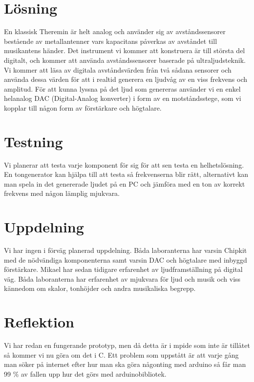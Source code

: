 \documentclass[a4paper,11pt]{article}
\begin{document}
\section*{Lösning}
En klassisk Theremin är helt analog och använder sig av avståndssensorer bestående av metallantenner vars kapacitans påverkas av avståndet till musikantens händer. Det instrument vi kommer att konstruera är till största del digitalt, och kommer att använda
avståndssensorer baserade på ultraljudsteknik. Vi kommer att läsa av digitala avståndsvärden från två sådana sensorer och använda dessa värden för att i realtid generera en ljudvåg av en viss frekvens och amplitud. För att kunna lyssna på det ljud som genereras använder vi en enkel helanalog DAC (Digital-Analog konverter) i form av en motståndsstege, som vi kopplar till någon form av förstärkare och högtalare.

\section*{Testning}
Vi planerar att testa varje komponent för sig för att sen testa en helhetslösning. En tongenerator kan hjälpa till att testa så frekvenserna blir rätt, alternativt kan man spela in det genererade ljudet på en PC och jämföra med en ton av korrekt frekvens med någon lämplig mjukvara.

\section*{Uppdelning}
Vi har ingen i förväg planerad uppdelning. Båda laboranterna har varsin Chipkit med de nödvändiga komponenterna samt varsin DAC och högtalare med inbyggd förstärkare. Mikael
har sedan tidigare erfarenhet av ljudframställning på digital väg. Båda laboranterna har erfarenhet av mjukvara för ljud och musik och viss kännedom om skalor, tonhöjder och andra musikaliska begrepp.

\section*{Reflektion}
Vi har redan en fungerande prototyp, men då detta är i mpide som inte är tillåtet
så kommer vi nu göra om det i C.
Ett problem som uppstått är att varje gång man söker på internet efter hur man ska 
göra någonting med arduino så får man 99 \% av fallen upp hur det görs med arduinobibliotek. 
\end{document}
